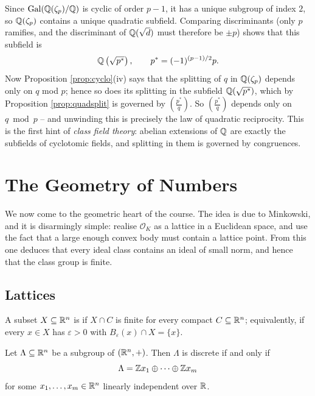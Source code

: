 \documentclass[a4paper]{scrartcl}
\renewcommand{\OO}{\mathcal{O}}
\newcommand{\Gal}{\operatorname{Gal}}
\newcommand{\legendre}[2]{\left( \frac{#1}{#2} \right)}
\begin{document}
\begin{remark}
	Since $\Gal(\Q(\zeta_p)/\Q)$ is cyclic of order $p-1$, it has a unique subgroup of index $2$, so $\mathbb{Q}(\zeta_p)$ contains a unique quadratic subfield. Comparing discriminants (only $p$ ramifies, and the discriminant of $\mathbb{Q}(\sqrt d)$ must therefore be $\pm p$) shows that this subfield is
	$$\mathbb{Q}\left(\sqrt{p^*}\right), \qquad p^* = (-1)^{(p-1)/2}p.$$
	Now Proposition \ref{prop:cyclo}(iv) says that the splitting of $q$ in $\mathbb{Q}(\zeta_p)$ depends only on $q$ mod $p$; hence so does its splitting in the subfield $\mathbb{Q}(\sqrt{p^*})$, which by Proposition \ref{prop:quadsplit} is governed by $\legendre{p^*}{q}$. So $\legendre{p^*}{q}$ depends only on $q \bmod p$ -- and unwinding this is precisely the law of quadratic reciprocity. This is the first hint of \emph{class field theory}: abelian extensions of $\mathbb{Q}$ are exactly the subfields of cyclotomic fields, and splitting in them is governed by congruences.
\end{remark}

\section{The Geometry of Numbers}\label{sec:geom}

We now come to the geometric heart of the course. The idea is due to Minkowski, and it is disarmingly simple: realise $\OO_K$ as a lattice in a Euclidean space, and use the fact that a large enough convex body must contain a lattice point. From this one deduces that every ideal class contains an ideal of small norm, and hence that the class group is finite.

\subsection{Lattices}

\begin{definition}[Discrete]
	A subset $X \subseteq \mathbb{R}^n$ is  if $X \cap C$ is finite for every compact $C \subseteq \mathbb{R}^n$; equivalently, if every $x \in X$ has $\varepsilon > 0$ with $B_\varepsilon(x)\cap X = \{x\}$.
\end{definition}

\begin{proposition}\label{prop:discrete}
	Let $\Lambda \subseteq \mathbb{R}^n$ be a subgroup of $(\mathbb{R}^n,+)$. Then $\Lambda$ is discrete if and only if
	$$\Lambda = \mathbb{Z} x_1 \oplus \dots \oplus \mathbb{Z} x_m$$
	for some $x_1,\dots,x_m \in \mathbb{R}^n$ linearly independent over $\mathbb{R}$.
\end{proposition}
\end{document}
